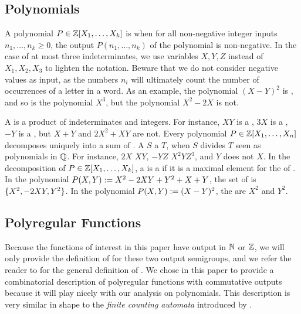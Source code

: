 \subsection{Polynomials} \AP A polynomial $P \in \mathbb{Z}[X_1, \dots, X_k]$ is
 when for all non-negative integer inputs $n_1, \dots, n_k
\geq 0$, the output  $P(n_1, \dots, n_k)$ of the polynomial is non-negative. In
the case of at most three indeterminates, we use variables $X,Y,Z$ instead of
$X_1, X_2, X_3$ to lighten the notation. Beware that we do not consider
negative values as input, as the numbers $n_i$ will ultimately count the number
of occurrences of a letter in a word. As an example, the polynomial $(X - Y)^2$
is , and so is the polynomial $X^3$, but the polynomial $X^2 -
2X$ is not.

\AP A  is a product of indeterminates and integers. For
instance, $XY$ is a , $3 X$ is a , $-Y$ is a
, but $X + Y$ and $2X^2 + XY$ are not. Every polynomial $P \in
\mathbb{Z}[X_1, \dots, X_n]$ decomposes uniquely into a sum of . A
 $S$  a  $T$, when $S$ divides $T$
seen as polynomials in $\mathbb{Q}$. For instance, $2X$  $XY$, $-YZ$
 $X^2 Y Z^3$, and $Y$ does not  $X$. In the
decomposition of $P \in \mathbb{Z}[X_1, \dots, X_k]$, a  is a
 if it is a maximal element for the  of . In the polynomial $P(X,Y) \mathrel{:=} X^2 - 2XY + Y^2
+ X + Y$, the set of  is $\mathopen{\{} X^2,  -2 XY,  Y^2 \mathclose{\}}$.
In the polynomial $P(X,Y) \mathrel{:=} (X - Y)^2$, the 
 are $X^2$ and $Y^2$.

\subsection{Polyregular Functions}
\label{polyregular:sec}

\AP Because the functions of interest in this paper have output in $\mathbb{N}$ or
$\mathbb{Z}$, we will only provide the definition of  for
these two output semigroups, and we refer the reader to \cite{BOKL19} for the
general definition of . 
We chose in this paper to provide a combinatorial description of
polyregular functions with commutative outputs because it will play nicely with
our analysis on polynomials. This description is very similar in shape to the
\emph{finite counting automata} introduced by \cite{SCHU62}. 

